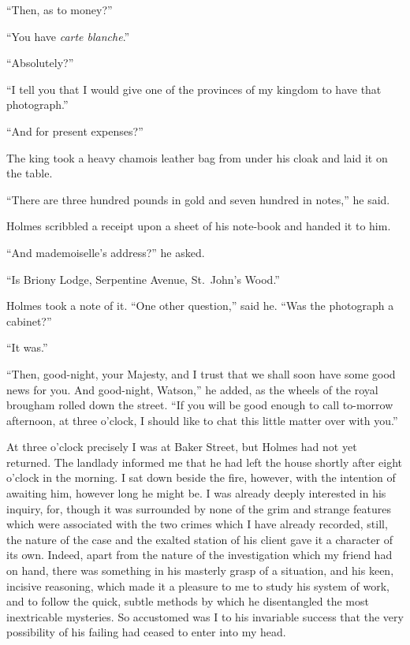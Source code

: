 “Then, as to money?”

“You have \textit{carte blanche}.”

“Absolutely?”

“I tell you that I would give one of the provinces of my
kingdom to have that photograph.”

“And for present expenses?”

The king took a heavy chamois leather bag from under his
cloak and laid it on the table.

“There are three hundred pounds in gold and seven hundred
in notes,” he said.

Holmes scribbled a receipt upon a sheet of his note-book
and handed it to him.

“And mademoiselle’s address?” he asked.

“Is Briony Lodge, Serpentine Avenue, St.~John’s Wood.”

Holmes took a note of it. “One other question,” said he.
“Was the photograph a cabinet?”

“It was.”

“Then, good-night, your Majesty, and I trust that we shall
soon have some good news for you. And good-night, Watson,”
he added, as the wheels of the royal brougham rolled down
the street. “If you will be good enough to call to-morrow
afternoon, at three o’clock, I should like to chat this little
matter over with you.”


At three o’clock precisely I was at Baker Street, but Holmes
had not yet returned. The landlady informed me that he had
left the house shortly after eight o’clock in the morning. I
sat down beside the fire, however, with the intention of awaiting
him, however long he might be. I was already deeply
interested in his inquiry, for, though it was surrounded by
none of the grim and strange features which were associated
with the two crimes which I have already recorded, still, the
nature of the case and the exalted station of his client gave
it a character of its own. Indeed, apart from the nature of the
investigation which my friend had on hand, there was something
in his masterly grasp of a situation, and his keen, incisive
reasoning, which made it a pleasure to me to study his
system of work, and to follow the quick, subtle methods by
which he disentangled the most inextricable mysteries. So
accustomed was I to his invariable success that the very
possibility of his failing had ceased to enter into my head.

